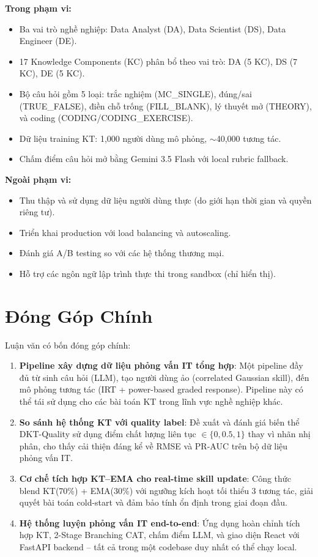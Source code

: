 \textbf{Trong phạm vi:}
\begin{itemize}
  \item Ba vai trò nghề nghiệp: Data Analyst (DA), Data Scientist (DS), Data Engineer (DE).
  \item 17 Knowledge Components (KC) phân bổ theo vai trò: DA (5 KC), DS (7 KC), DE (5 KC).
  \item Bộ câu hỏi gồm 5 loại: trắc nghiệm (MC\_SINGLE), đúng/sai (TRUE\_FALSE), điền chỗ trống (FILL\_BLANK), lý thuyết mở (THEORY), và coding (CODING/CODING\_EXERCISE).
  \item Dữ liệu training KT: 1{,}000 người dùng mô phỏng, $\sim$40{,}000 tương tác.
  \item Chấm điểm câu hỏi mở bằng Gemini 3.5 Flash với local rubric fallback.
\end{itemize}

\textbf{Ngoài phạm vi:}
\begin{itemize}
  \item Thu thập và sử dụng dữ liệu người dùng thực (do giới hạn thời gian và quyền riêng tư).
  \item Triển khai production với load balancing và autoscaling.
  \item Đánh giá A/B testing so với các hệ thống thương mại.
  \item Hỗ trợ các ngôn ngữ lập trình thực thi trong sandbox (chỉ hiển thị).
\end{itemize}

\section{Đóng Góp Chính}
\label{sec:contributions}

Luận văn có bốn đóng góp chính:

\begin{enumerate}
  \item \textbf{Pipeline xây dựng dữ liệu phỏng vấn IT tổng hợp}: Một pipeline đầy đủ từ sinh câu hỏi (LLM), tạo người dùng ảo (correlated Gaussian skill), đến mô phỏng tương tác (IRT + power-based graded response). Pipeline này có thể tái sử dụng cho các bài toán KT trong lĩnh vực nghề nghiệp khác.

  \item \textbf{So sánh hệ thống KT với quality label}: Đề xuất và đánh giá biến thể DKT-Quality sử dụng điểm chất lượng liên tục $\in \{0, 0.5, 1\}$ thay vì nhãn nhị phân, cho thấy cải thiện đáng kể về RMSE và PR-AUC trên bộ dữ liệu phỏng vấn IT.

  \item \textbf{Cơ chế tích hợp KT--EMA cho real-time skill update}: Công thức blend KT(70\%) + EMA(30\%) với ngưỡng kích hoạt tối thiểu 3 tương tác, giải quyết bài toán cold-start và đảm bảo tính ổn định trong giai đoạn đầu.

  \item \textbf{Hệ thống luyện phỏng vấn IT end-to-end}: Ứng dụng \system{} hoàn chỉnh tích hợp KT, 2-Stage Branching CAT, chấm điểm LLM, và giao diện React với FastAPI backend -- tất cả trong một codebase duy nhất có thể chạy local.
\end{enumerate}


